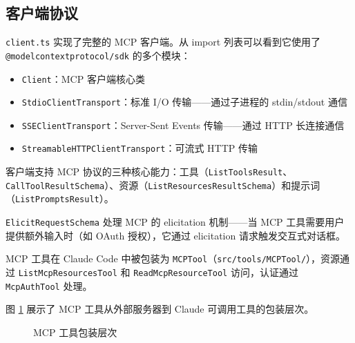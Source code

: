 \subsection{客户端协议}

\texttt{client.ts} 实现了完整的 MCP 客户端。从 import 列表可以看到它使用了 \texttt{@modelcontextprotocol/sdk} 的多个模块：

\begin{itemize}
  \item \texttt{Client}：MCP 客户端核心类
  \item \texttt{StdioClientTransport}：标准 I/O 传输——通过子进程的 stdin/stdout 通信
  \item \texttt{SSEClientTransport}：Server-Sent Events 传输——通过 HTTP 长连接通信
  \item \texttt{StreamableHTTPClientTransport}：可流式 HTTP 传输
\end{itemize}

客户端支持 MCP 协议的三种核心能力：工具（\texttt{ListToolsResult}、\texttt{CallToolResultSchema}）、资源（\texttt{ListResourcesResultSchema}）和提示词（\texttt{ListPromptsResult}）。

\texttt{ElicitRequestSchema} 处理 MCP 的 elicitation 机制——当 MCP 工具需要用户提供额外输入时（如 OAuth 授权），它通过 elicitation 请求触发交互式对话框。

MCP 工具在 Claude Code 中被包装为 \texttt{MCPTool}（\texttt{src/tools/MCPTool/}），资源通过 \texttt{ListMcpResourcesTool} 和 \texttt{ReadMcpResourceTool} 访问，认证通过 \texttt{McpAuthTool} 处理。

图 \ref{fig:mcp-tool-wrapping} 展示了 MCP 工具从外部服务器到 Claude 可调用工具的包装层次。

\begin{figure}[htbp]
\centering
{}
\caption{MCP 工具包装层次}
\label{fig:mcp-tool-wrapping}
\end{figure}

